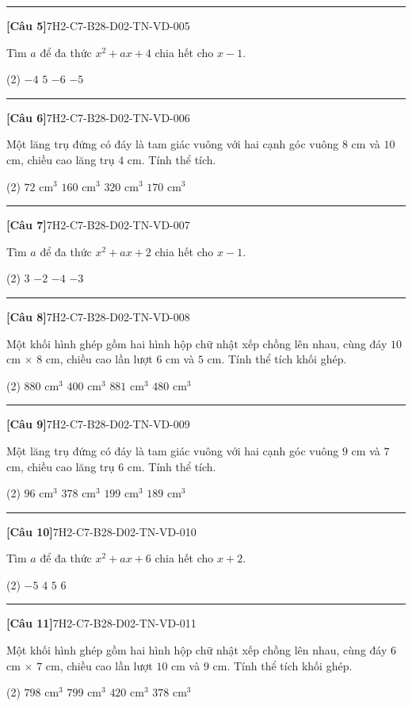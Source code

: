 \documentclass[12pt,a4paper]{article}
\newif\ifloigiai
\newenvironment{cauhoi}[2]{%
  \par\medskip\noindent\rule{\textwidth}{0.4pt}\par\nopagebreak
  \noindent\textbf{[#1]}\hfill{\scriptsize\ttfamily #2}\par\nopagebreak\smallskip}{\par}
\newcommand{\dapan}[1]{\ifloigiai\par\smallskip\noindent\textit{Đáp án:} \textbf{#1}\par\fi}
\begin{document}
\begin{cauhoi}{Câu 5}{7H2-C7-B28-D02-TN-VD-005}
Tìm $a$ để đa thức $x^{2}+ax+4$ chia hết cho $x-1$.
\begin{tasks}(2)
\task $-4$
\task $5$
\task $-6$
\task $-5$
\end{tasks}
\dapan{D}
\end{cauhoi}
\begin{cauhoi}{Câu 6}{7H2-C7-B28-D02-TN-VD-006}
Một lăng trụ đứng có đáy là tam giác vuông với hai cạnh góc vuông $8$ cm và $10$ cm, chiều cao lăng trụ $4$ cm. Tính thể tích.
\begin{tasks}(2)
\task $72\text{ cm}^3$
\task $160\text{ cm}^3$
\task $320\text{ cm}^3$
\task $170\text{ cm}^3$
\end{tasks}
\dapan{B}
\end{cauhoi}
\begin{cauhoi}{Câu 7}{7H2-C7-B28-D02-TN-VD-007}
Tìm $a$ để đa thức $x^{2}+ax+2$ chia hết cho $x-1$.
\begin{tasks}(2)
\task $3$
\task $-2$
\task $-4$
\task $-3$
\end{tasks}
\dapan{D}
\end{cauhoi}
\begin{cauhoi}{Câu 8}{7H2-C7-B28-D02-TN-VD-008}
Một khối hình ghép gồm hai hình hộp chữ nhật xếp chồng lên nhau, cùng đáy $10$ cm $\times$ $8$ cm, chiều cao lần lượt $6$ cm và $5$ cm. Tính thể tích khối ghép.
\begin{tasks}(2)
\task $880\text{ cm}^3$
\task $400\text{ cm}^3$
\task $881\text{ cm}^3$
\task $480\text{ cm}^3$
\end{tasks}
\dapan{A}
\end{cauhoi}
\begin{cauhoi}{Câu 9}{7H2-C7-B28-D02-TN-VD-009}
Một lăng trụ đứng có đáy là tam giác vuông với hai cạnh góc vuông $9$ cm và $7$ cm, chiều cao lăng trụ $6$ cm. Tính thể tích.
\begin{tasks}(2)
\task $96\text{ cm}^3$
\task $378\text{ cm}^3$
\task $199\text{ cm}^3$
\task $189\text{ cm}^3$
\end{tasks}
\dapan{D}
\end{cauhoi}
\begin{cauhoi}{Câu 10}{7H2-C7-B28-D02-TN-VD-010}
Tìm $a$ để đa thức $x^{2}+ax+6$ chia hết cho $x+2$.
\begin{tasks}(2)
\task $-5$
\task $4$
\task $5$
\task $6$
\end{tasks}
\dapan{C}
\end{cauhoi}
\begin{cauhoi}{Câu 11}{7H2-C7-B28-D02-TN-VD-011}
Một khối hình ghép gồm hai hình hộp chữ nhật xếp chồng lên nhau, cùng đáy $6$ cm $\times$ $7$ cm, chiều cao lần lượt $10$ cm và $9$ cm. Tính thể tích khối ghép.
\begin{tasks}(2)
\task $798\text{ cm}^3$
\task $799\text{ cm}^3$
\task $420\text{ cm}^3$
\task $378\text{ cm}^3$
\end{tasks}
\dapan{A}
\end{cauhoi}
\end{document}
